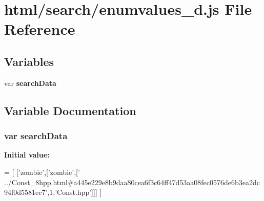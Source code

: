 \section{html/search/enumvalues\-\_\-d.js File Reference}
\label{enumvalues__d_8js}
\subsection*{Variables}
\begin{DoxyCompactItemize}
\item 
var {\bf search\-Data}
\end{DoxyCompactItemize}


\subsection{Variable Documentation}
\subsubsection[{search\-Data}]{\setlength{\rightskip}{0pt plus 5cm}var search\-Data}\label{enumvalues__d_8js_ad01a7523f103d6242ef9b0451861231e}
{\bfseries Initial value\-:}
\begin{DoxyCode}
=
[
  [\textcolor{stringliteral}{'zombie'},[\textcolor{stringliteral}{'zombie'},[\textcolor{stringliteral}{'
      ../Const\_8hpp.html#a445e229e8b9daa80cea6f3c64ff47d53aa08fec0576de6b3ea2dc94f0d5581ec7'},1,\textcolor{stringliteral}{'Const.hpp'}]]]
]
\end{DoxyCode}
